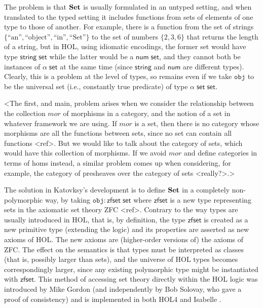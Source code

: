 \documentclass[twoside,titlepage,11pt]{article}
\begin{document}
The problem is that $\mathbf{Set}$ is usually formulated in an untyped setting, and when translated to the typed setting it includes functions from sets of elements of one type to those of another.
For example, there is a function from the set of strings $\{\text{``an''},\text{``object''},\text{``in''},\text{``Set''}\}$ to the set of numbers $\{2,3,6\}$ that returns the length of a string, but in HOL, using idiomatic encodings, the former set would have type $\mathsf{string}\;\mathsf{set}$ while the latter would be a $\mathsf{num}\;\mathsf{set}$, and they cannot both be instances of $\alpha\;\mathsf{set}$ at the same time (since $\mathsf{string}$ and $\mathsf{num}$ are different types).
Clearly, this is a problem at the level of types, so remains even if we take $\mathtt{obj}$ to be the universal set (i.e., constantly true predicate) of type $\alpha\;\mathsf{set}\;\mathsf{set}$.

<The first, and main, problem arises when we consider the relationship between the collection $mor$ of morphisms in a category, and the notion of a set in whatever framework we are using.
If $mor$ is a set, then there is no category whose morphisms are all the functions between sets, since no set can contain all functions <ref>.
But we would like to talk about the category of sets, which would have this collection of morphisms.
If we avoid $mor$ and define categories in terms of homs instead, a similar problem comes up when considering, for example, the category of presheaves over the category of sets <really?>.>

The solution in Katovksy's development is to define $\mathbf{Set}$ in a completely non-polymorphic way, by taking $\mathtt{obj}:\mathsf{zfset}\;\mathsf{set}$ where $\mathsf{zfset}$ is a new type representing sets in the axiomatic set theory ZFC <ref>.
Contrary to the way types are usually introduced in HOL, that is, by definition, the type $\mathsf{zfset}$ is created as a new primitive type (extending the logic) and its properties are asserted as new axioms of HOL.
The new axioms are (higher-order versions of) the axioms of ZFC.
The effect on the semantics is that types must be interpreted as classes (that is, possibly larger than sets), and the universe of HOL types becomes correspondingly larger, since any existing polymorphic type might be instantiated with $\mathsf{zfset}$.
This method of accessing set theory directly within the HOL logic was introduced by Mike Gordon \cite{DBLP:conf/tphol/Gordon96} (and independently by Bob Solovay, who gave a proof of consistency) and is implemented in both HOL4 and Isabelle \cite{DBLP:conf/ictac/Obua06}.
\end{document}
